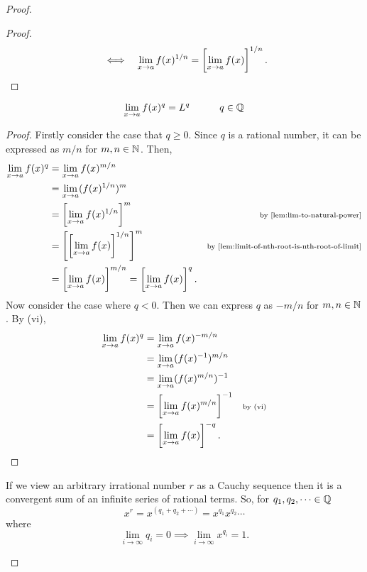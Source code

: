 \documentclass[../MathsNotesBase.tex]{subfiles}
\begin{document}
{\begin{proof}
\begin{enumerate}[label=(\roman*)]
{\begin{proof}
\begin{align*}
						&\iff & \lim_{x \to a} f(x)^{1/n} &= \left[\lim_{x \to a} f(x)\right]^{1/n}. \qedhere \\
						\end{align*}
					\end{proof}
					\begin{lemma}
						\[ \lim_{x \to a} f(x)^q = L^q \hspace{30pt} q \in \mathbb{Q}^{} \]
					\end{lemma}
					\begin{proof}
						Firstly consider the case that ${ q \geq 0 }$. Since $q$ is a rational number, it can be expressed as ${ m/n }$ for ${ m,n \in \mathbb{N}^{} }$. Then,
						\begin{align*}
						\lim_{x \to a} f(x)^q &= \lim_{x \to a} f(x)^{m/n} \\
						&= \lim_{x \to a} (f(x)^{1/n})^m &\sidecomment{} \\
						&= \left[\lim_{x \to a} f(x)^{1/n}\right]^m &\sidecomment{by \autoref{lem:lim-to-natural-power}} \\
						&= \left[\left[\lim_{x \to a} f(x)\right]^{1/n}\right]^m &\sidecomment{by \autoref{lem:limit-of-nth-root-is-nth-root-of-limit}} \\
						&= \left[\lim_{x \to a} f(x)\right]^{m/n} = \left[\lim_{x \to a} f(x)\right]^q.
						\end{align*}
						Now consider the case where ${ q < 0 }$. Then we can express $q$ as ${ -m/n }$ for ${ m,n \in \mathbb{N}^{} }$. By (vi), 
						\begin{align*}
						\lim_{x \to a} f(x)^q &= \lim_{x \to a} f(x)^{-m/n} \\
						&= \lim_{x \to a} (f(x)^{-1})^{m/n} &\text{\scriptsize{}} \\
						&= \lim_{x \to a} (f(x)^{m/n})^{-1} &\text{\scriptsize{}} \\
						&= \left[\lim_{x \to a} f(x)^{m/n}\right]^{-1} &\text{\scriptsize{by (vi)}} \\
						&= \left[\lim_{x \to a} f(x)\right]^{-q}. \qedhere
						\end{align*}
					\end{proof}
					If we view an arbitrary irrational number $r$ as a Cauchy sequence then it is a convergent sum of an infinite series of rational terms. So, for ${ q_1,q_2,\dots \in \mathbb{Q}^{} }$
					\[ x^r = x^{(q_1 + q_2 + \cdots)} = x^{q_1}x^{q_2}\cdots \]
					where 
					\[ \lim_{i \to \infty} q_i = 0 \implies \lim_{i \to \infty} x^{q_i} = 1. \]
}
\end{enumerate}
\end{proof}}
\end{document}
